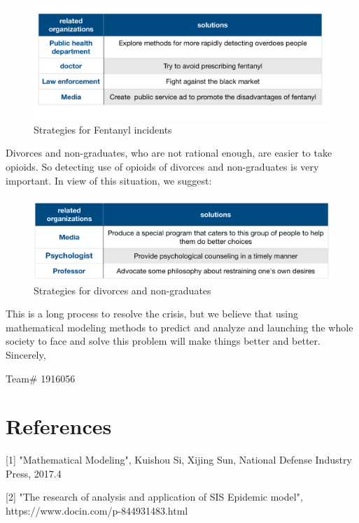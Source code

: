 \documentclass[12pt]{article}
\begin{document}
\begin{figure}[!htbp]
\small
\centering
\includegraphics[width=16cm]{Fig/memo1.png}
\caption{Strategies for Fentanyl incidents}
\end{figure}

Divorces and non-graduates, who are not rational enough, are easier to take opioids. So detecting use of opioids of divorces and non-graduates is very important. In view of this situation, we suggest:

\begin{figure}[!htbp]
\small
\centering
\includegraphics[width=16cm]{Fig/memo2.png}
\caption{Strategies for divorces and non-graduates}
\end{figure}

This is a long process to resolve the crisis, but we believe that using mathematical modeling methods to predict and analyze and launching the whole society to face and solve this problem will make things better and better.\\


Sincerely,

Team\# 1916056

\pagebreak
\section{References}
[1] "Mathematical Modeling", Kuishou Si, Xijing Sun, National Defense Industry Press, 2017.4 

[2] "The research of analysis and application of SIS Epidemic model",\\
https://www.docin.com/p-844931483.html
\end{document}
